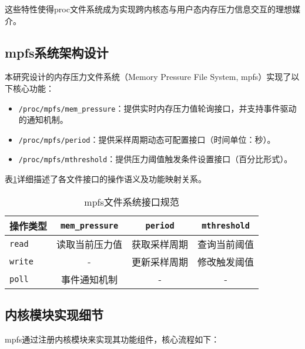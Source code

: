 这些特性使得proc文件系统成为实现跨内核态与用户态内存压力信息交互的理想媒介。

\subsection{mpfs系统架构设计}

本研究设计的内存压力文件系统（Memory Pressure File System, mpfs）实现了以下核心功能：

\begin{itemize}
    \item \texttt{/proc/mpfs/mem\_pressure}：提供实时内存压力值轮询接口，并支持事件驱动的通知机制。
    \item \texttt{/proc/mpfs/period}：提供采样周期动态可配置接口（时间单位：秒）。
    \item \texttt{/proc/mpfs/mthreshold}：提供压力阈值触发条件设置接口（百分比形式）。
\end{itemize}

表\ref{tab:mpfs_files}详细描述了各文件接口的操作语义及功能映射关系。

\begin{table}[H]
    \centering
    \caption{mpfs文件系统接口规范}
    \label{tab:mpfs_files}
    \begin{tabular}{lccc}
        \toprule
        \textbf{操作类型} & \texttt{mem\_pressure} & \texttt{period} & \texttt{mthreshold} \\
        \midrule
        \texttt{read} & 读取当前压力值 & 获取采样周期 & 查询当前阈值 \\
        \texttt{write} & - & 更新采样周期 & 修改触发阈值 \\
        \texttt{poll} & 事件通知机制 & - & - \\
        \bottomrule
    \end{tabular}
\end{table}

\subsection{内核模块实现细节}

mpfs通过注册内核模块来实现其功能组件，核心流程如下：

